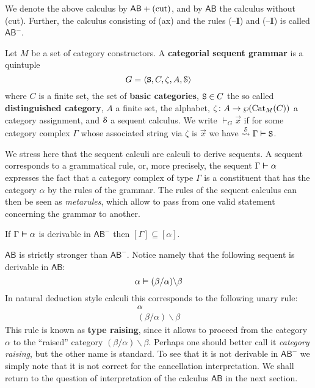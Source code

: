 We denote the above calculus by $\mathsf{AB} + \mbox{\rm (cut)}$, 
and by $\mathsf{AB}$ the calculus without (cut). Further, the 
calculus consisting of (ax) and the rules ({\mtt{\tb}}--\textbf{I}) and 
({\mtt{\tf}}--\textbf{I}) is called $\mathsf{AB}^{-}$.
\begin{defn}
Let $M$ be a set of category constructors.
A \textbf{categorial sequent grammar} is a quintuple
\begin{equation}
G = \langle \mbox{\tt S}, C, \zeta, A, \mathcal{S}\rangle
\end{equation}
where $C$ is a finite
set, the set of \textbf{basic categories}, $\mbox{\tt S} \in C$ the
so called \textbf{distinguished category}, $A$ a finite set,
the alphabet, $\zeta \colon A \rightarrow \wp(\operatorname{Cat}_M(C))$ a category 
assignment, and $\mathcal{S}$ a sequent calculus. We write $\vdash_G \vec{x}$ 
if for some category complex 
$\Gamma$ whose associated string via $\zeta$ is $\vec{x}$ we have
$\stackrel{\mathcal{S}}{\rightsquigarrow} \Gamma \boldsymbol{\vdash} \mbox{\tt S}$.
\end{defn}
We stress here that the sequent calculi are calculi to derive sequents. 
A sequent corresponds to a grammatical rule, or, more precisely, 
the sequent $\Gamma \boldsymbol{\vdash} \alpha$ expresses the fact that a 
category complex of type $\Gamma$ is a constituent that has the 
category $\alpha$ by the rules of the grammar. The rules of the 
sequent calculus can then be seen as {\it metarules}, which allow 
to pass from one valid statement 
concerning the grammar to another. 
\begin{prop}[Correctness]
\label{korrektheit}
If $\Gamma \boldsymbol{\vdash} \alpha$ is derivable in $\mathsf{AB}^{-}$
then $[\Gamma] \subseteq [\alpha]$.
\end{prop}
$\mathsf{AB}$ is strictly stronger than $\mathsf{AB}^-$. Notice namely
that the following sequent is derivable in $\mathsf{AB}$:
\begin{equation}
\alpha \boldsymbol{\vdash} (\beta/\alpha)\backslash\beta
\end{equation}
In natural deduction style calculi this corresponds to the
following unary rule:
\begin{equation}
\begin{array}{c}
\alpha \\\hline
(\beta/\alpha)\backslash\beta
\end{array}
\end{equation}
This rule is known as \textbf{type raising},
since it allows to proceed from the category $\alpha$ to the
``raised'' category $(\beta/\alpha)\backslash\beta$. Perhaps 
one should better call it {\it category raising}, but the other name 
is standard. To see that it is not derivable in $\mathsf{AB}^-$
we simply note that it is not correct for the cancellation
interpretation. We shall return to the question of interpretation
of the calculus $\mathsf{AB}$ in the next section.

